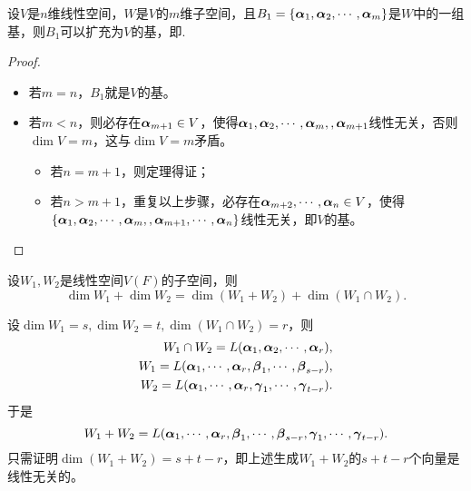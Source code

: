 \begin{frame}
  \begin{dingli}
    设$V$是$n$维线性空间，$W$是$V$的$m$维子空间，且$B_1=\{\boldsymbol{\alpha}_1,\boldsymbol{\alpha}_2,\cdots,\boldsymbol{\alpha}_m\}$是$W$中的一组基，则$B_1$可以扩充为$V$的基，即.
  \end{dingli}
  \vspace{.1in}\pause 
  
  \begin{proof}
    \begin{itemize}
    \item 若$m=n$，$B_1$就是$V$的基。 \\[0.1in] \pause 
    \item 若$m<n$，则必存在$\boldsymbol{\alpha}_{m+1}\in V$，使得$\boldsymbol{\alpha}_1,\boldsymbol{\alpha}_2,\cdots,\boldsymbol{\alpha}_m,,\boldsymbol{\alpha}_{m+1}$线性无关，否则$\dim V=m$，这与$\dim V=m$矛盾。\\[0.1in] \pause
      \begin{itemize}
      \item 若$n=m+1$，则定理得证；\\[0.1in] \pause
      \item 若$n>m+1$，重复以上步骤，必存在$\boldsymbol{\alpha}_{m+2},\cdots,\boldsymbol{\alpha}_n\in V$，使得$\{\boldsymbol{\alpha}_1,\boldsymbol{\alpha}_2,\cdots,\boldsymbol{\alpha}_m,,\boldsymbol{\alpha}_{m+1},\cdots,\boldsymbol{\alpha}_n\}$线性无关，即$V$的基。
      \end{itemize}
    \end{itemize}
  \end{proof}
\end{frame}

\begin{frame}
  \begin{dingli}[子空间的维数公式]
    设$W_1,W_2$是线性空间$V(F)$的子空间，则
    $$
    \dim W_1 + \dim W_2 = \dim(W_1+W_2) + \dim(W_1\cap W_2).
    $$
  \end{dingli}
  \vspace{.1in}\pause 

    设$\dim W_1 = s, \dim W_2 = t, \dim(W_1\cap W_2) = r$，则
    $$
    \begin{aligned}
    W_1\cap W_2 = L(\boldsymbol{\alpha}_1,\boldsymbol{\alpha}_2,\cdots,\boldsymbol{\alpha}_r), \\
    W_1=L(\boldsymbol{\alpha}_1,\cdots,\boldsymbol{\alpha}_r,\boldsymbol{\beta}_1,\cdots,\boldsymbol{\beta}_{s-r}), \\
    W_2=L(\boldsymbol{\alpha}_1,\cdots,\boldsymbol{\alpha}_r,\boldsymbol{\gamma}_1,\cdots,\boldsymbol{\gamma}_{t-r}).
    \end{aligned}
    $$
    于是
    $$
    W_1+W_2 = L(\boldsymbol{\alpha}_1,\cdots,\boldsymbol{\alpha}_r,\boldsymbol{\beta}_1,\cdots,\boldsymbol{\beta}_{s-r},\boldsymbol{\gamma}_1,\cdots,\boldsymbol{\gamma}_{t-r}).
    $$
    只需证明$\dim(W_1+W_2)=s+t-r$，即上述生成$W_1+W_2$的$s+t-r$个向量是线性无关的。

\end{frame}

